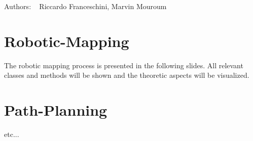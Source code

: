 Authors\+: ~\newline
Riccardo Franceschini, Marvin Mouroum ~\newline
 \hypertarget{index_Robotic-Mapping}{}\section{Robotic-\/\+Mapping}\label{index_Robotic-Mapping}
The robotic mapping process is presented in the following slides. All relevant classes and methods will be shown and the theoretic aspects will be visualized. ~\newline
                   \hypertarget{index_Path-Planning}{}\section{Path-\/\+Planning}\label{index_Path-Planning}
etc... 